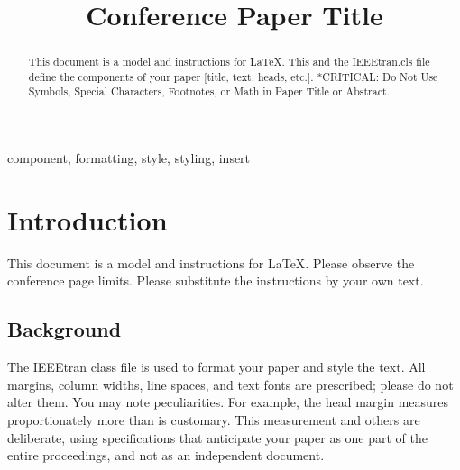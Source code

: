 \documentclass[conference]{IEEEtran}
\begin{document}
\title{Conference Paper Title %
}

\author{
\and
{}
\and
{}
}

\maketitle

\begin{abstract}
This document is a model and instructions for \LaTeX.
This and the IEEEtran.cls file define the components of your paper [title, text, heads, etc.]. *CRITICAL: Do Not Use Symbols, Special Characters, Footnotes, 
or Math in Paper Title or Abstract.
\end{abstract}

\begin{IEEEkeywords}
component, formatting, style, styling, insert
\end{IEEEkeywords}

\section{Introduction}
This document is a model and instructions for \LaTeX.
Please observe the conference page limits. 
Please substitute the instructions by your own text.

\subsection{Background}
The IEEEtran class file is used to format your paper and style the text. All margins, column widths, line spaces, and text fonts are prescribed; please do not alter them. You may note peculiarities. For example, the head margin measures proportionately more than is customary. This measurement and others are deliberate, using specifications that anticipate your paper as one part of the entire proceedings, and not as an independent document. 
\end{document}
